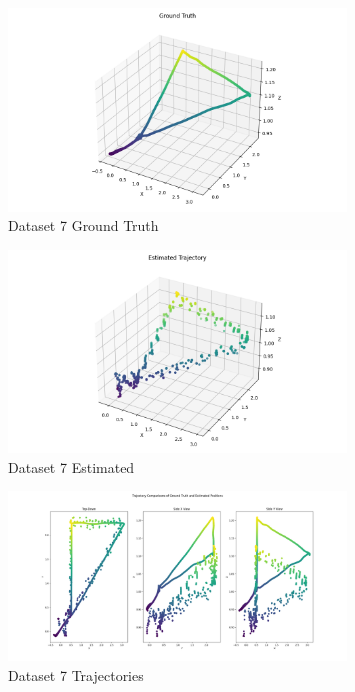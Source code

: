 \documentclass{article}
\begin{document}
\begin{figure}[H]
    \centering
    \includegraphics[width=0.8\textwidth]{./imgs/task1_2/studentdata7_ground_truth.png}
    \caption{Dataset 7 Ground Truth}
\end{figure}

\begin{figure}[H]
    \centering
    \includegraphics[width=0.8\textwidth]{./imgs/task1_2/studentdata7_estimated.png}
    \caption{Dataset 7 Estimated}
\end{figure}

\begin{figure}[H]
    \centering
    \includegraphics[width=0.8\textwidth]{./imgs/task1_2/studentdata7_trajectory_merged.png}
    \caption{Dataset 7 Trajectories}
\end{figure}
\end{document}
